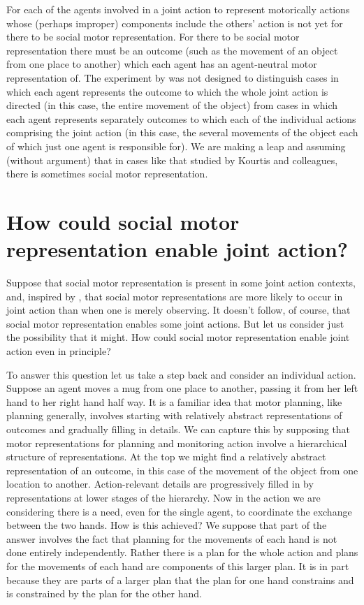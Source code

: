 \documentclass[12pt,\papersize]{extarticle}
\begin{document}
For each of the agents involved in a joint action to represent motorically actions whose (perhaps improper) components include the others' action is not yet for there to be social motor representation.
For there to be social motor representation there must be an outcome (such as the movement of an object from one place to another) which each agent has an agent-neutral motor representation of.
The experiment by \citet{kourtis:2010_favoritism} was not designed to distinguish
cases in which each agent represents the outcome to which the  whole joint action is directed (in this case, the entire movement of the object)
from
 cases in which 
each agent represents separately outcomes to which each of the individual actions comprising the joint action (in this case, the several movements of the object each of which just one agent is responsible for).
We are making a leap and assuming (without argument) that in cases like that studied by Kourtis and colleagues, there is sometimes social motor representation.



\section{How could social motor representation enable joint action?}
Suppose that social motor representation is present in some joint action contexts, and, inspired by \citet{kourtis:2010_favoritism}, that 
social motor representations are more likely to occur in joint action than when one is merely observing.
It doesn't follow, of course, that social motor representation enables some joint actions.
But let us consider just the possibility that it might.
How could social motor representation enable joint action even in principle?

To answer this question
let us take a step back and consider an individual action.
Suppose an agent moves a mug from one place to another, passing it from her left hand to her right hand half way.
It is a familiar idea that motor planning, like planning generally, involves starting with relatively abstract representations of outcomes and gradually filling in details.
We can capture this by supposing that 
motor representations for planning and monitoring action involve a hierarchical structure of representations.
At the top we might find a relatively abstract representation of an outcome, in this case of the movement of the object from one location to another.
Action-relevant details are progressively filled in by representations at lower stages of the hierarchy. 
Now in the action we are considering there is a need, even for the single agent, to coordinate the exchange between the two hands.
How is this achieved? 
We suppose that part of the answer involves the fact that planning for the movements of each hand is not done entirely independently.
Rather there is a plan for the whole action
and plans for the movements of each hand are components of this larger plan.
It is in part because they are parts of a larger plan that the plan for one hand constrains and is constrained by the plan for the other hand.
\end{document}
